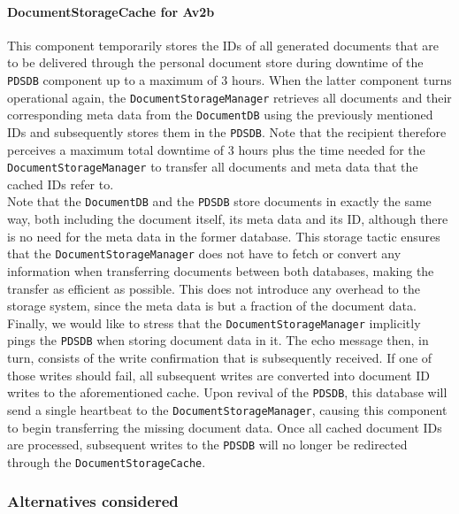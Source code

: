 \documentclass[a4paper,10pt]{article}
\begin{document}
\paragraph{DocumentStorageCache for Av2b}
This component temporarily stores the IDs of all generated documents that are to be delivered through the personal document store during downtime of the \texttt{PDSDB} component up to a maximum of 3 hours. When the latter component turns operational again, the \texttt{DocumentStorageManager} retrieves all documents and their corresponding meta data from the \texttt{DocumentDB} using the previously mentioned IDs and subsequently stores them in the \texttt{PDSDB}. Note that the recipient therefore perceives a maximum total downtime of 3 hours plus the time needed for the \texttt{DocumentStorageManager} to transfer all documents and meta data that the cached IDs refer to. \\
Note that the \texttt{DocumentDB} and the \texttt{PDSDB} store documents in exactly the same way, both including the document itself, its meta data and its ID, although there is no need for the meta data in the former database. This storage tactic ensures that the \texttt{DocumentStorageManager} does not have to fetch or convert any information when transferring documents between both databases, making the transfer as efficient as possible. This does not introduce any overhead to the storage system, since the meta data is but a fraction of the document data. \\
Finally, we would like to stress that the \texttt{DocumentStorageManager} implicitly pings the \texttt{PDSDB} when storing document data in it. The echo message then, in turn, consists of the write confirmation that is subsequently received. If one of those writes should fail, all subsequent writes are converted into document ID writes to the aforementioned cache. Upon revival of the \texttt{PDSDB}, this database will send a single heartbeat to the \texttt{DocumentStorageManager}, causing this component to begin transferring the missing document data. Once all cached document IDs are processed, subsequent writes to the \texttt{PDSDB} will no longer be redirected through the \texttt{DocumentStorageCache}.



\subsubsection*{Alternatives considered}
\end{document}
